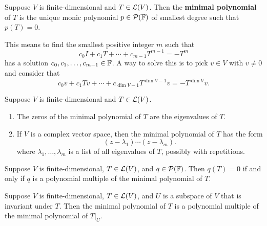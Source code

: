 \documentclass{extarticle}
\begin{document}
\begin{definition}
    Suppose \(V\) is finite-dimensional and \(T \in \mathcal{L}(V)\). Then the \textbf{minimal polynomial} of \(T\)
    is the unique monic polynomial \(p \in \mathcal{P}(\mathbb{F})\) of smallest degree such that \(p(T) = 0\).
\end{definition}

\begin{remark}
    This means to find the smallest positive integer \(m\) such that 
    \[c_0 I + c_1 T + \cdots + c_{m-1}T^{m-1} = -T^{m}\]
    has a solution \(c_0, c_1, \ldots, c_{m-1} \in \mathbb{F}\). A way to solve this is to pick \(v \in V\) 
    with \(v \neq 0\) and consider that 
    \[c_0 v + c_1 Tv + \cdots + c_{\dim V - 1} T^{\dim V - 1} v = - T^{\dim V}v.\]
\end{remark}






\begin{thm}
    Suppose \(V\) is finite-dimensional and \(T \in \mathcal{L}(V)\). 
    \begin{enumerate}[label=(\alph*)]
        \item The zeros of the minimal polynomial of \(T\) are the eigenvalues of \(T\). 
        \item If \(V\) is a complex vector space, then the minimal polynomial of \(T\) has the 
        form 
        \[(z - \lambda_1) \cdots (z-\lambda_m).\]
        where \(\lambda_1, \ldots, \lambda_m\) is a list of all eigenvalues of \(T\), possibly with repetitions.
    \end{enumerate}
\end{thm}


\begin{thm}[\(q(T) = 0 \Leftrightarrow q\) is a polynomial multiple of the minimal polynomial]
    Suppose \(V\) is finite-dimensional, \(T \in \mathcal{L}(V)\), and \(q \in \mathcal{P}(\mathbb{F})\). Then 
    \(q(T) = 0\) if and only if \(q\) is a polynomial multiple of the minimal polynomial of \(T\).
\end{thm}


\begin{thm}
    Suppose \(V\) is finite-dimensional, \(T \in \mathcal{L}(V)\), and \(U\) is a subspace of \(V\) that is invariant 
    under \(T\). Then the minimal polynomial of \(T\) is a polynomial multiple of the minimal polynomial of 
    \(T |_U\).
\end{thm}
\end{document}
